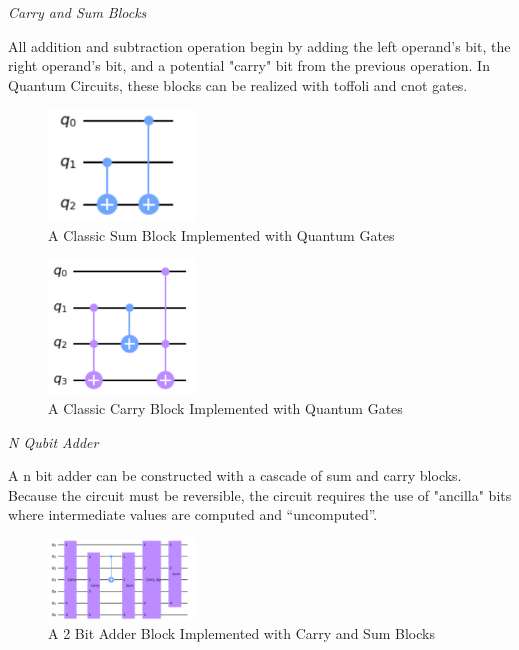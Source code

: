 \documentclass[journal]{IEEEtran}
\begin{document}
\emph{Carry and Sum Blocks}

All addition and subtraction operation begin by adding the left operand's bit,
the right operand's bit, and a potential "carry" bit from the previous
operation. In Quantum Circuits, these blocks can be realized with toffoli and
cnot gates.

\begin{figure}[H]
    \begin{center}
        \includegraphics[width=0.35\textwidth]{Sum.png}
        \caption{\label{fig:Sum} A Classic Sum Block Implemented with Quantum Gates}
    \end{center}
\end{figure}

\begin{figure}[H]
    \begin{center}
        \includegraphics[width=0.35\textwidth]{Carry.png}
        \caption{\label{fig:Carry} A Classic Carry Block Implemented with Quantum Gates}
    \end{center}
\end{figure}

\emph{N Qubit Adder}

A n bit adder can be constructed with a cascade of sum and carry blocks. Because
the circuit must be reversible, the circuit requires the use of "ancilla" bits
where intermediate values are computed and ``uncomputed''.

\begin{figure}[H]
    \begin{center}
        \includegraphics[width=0.35\textwidth]{Adder.png}
        \caption{\label{fig:Adder} A 2 Bit Adder Block Implemented with Carry and Sum Blocks }
    \end{center}
\end{figure}
\end{document}
